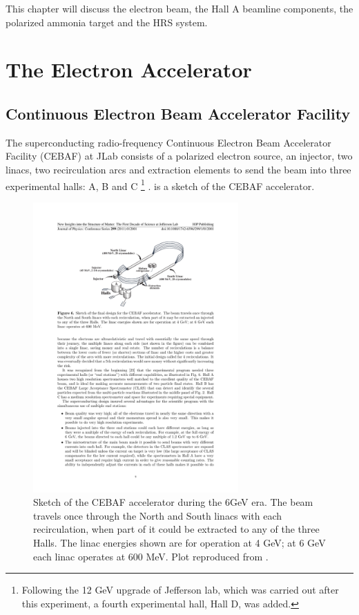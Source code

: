 This chapter will discuss the electron beam, the Hall A beamline components, the polarized ammonia target and the HRS system.

\section{The Electron Accelerator}
\label{C5S1}

\subsection{Continuous Electron Beam Accelerator Facility}
\label{C5S1SS1}

The superconducting radio-frequency Continuous Electron Beam Accelerator Facility (CEBAF) at JLab consists of a polarized electron source, an injector, two linacs, two recirculation arcs and extraction elements to send the beam into three experimental halls: A, B and C \footnote{Following the 12 GeV upgrade of Jefferson lab, which was carried out after this experiment, a fourth experimental hall, Hall D, was added.} \cite{Sulkosky2007}.  is a sketch of the CEBAF accelerator.

\begin{figure}[tb!]
  \centering
  \includegraphics[width=0.7\textwidth]{figs/accelerator.pdf}
  \caption[Sketch of the CEBAF accelerator.]{Sketch of the CEBAF accelerator during the 6GeV era. The beam travels once through the North and South linacs with each recirculation, when part of it could be extracted to any of the three Halls. The linac energies shown are for operation at 4 GeV; at 6 GeV each linac operates at 600 MeV. Plot reproduced from \cite{Gross2011}. \label{C5S1SS1F1}}
\end{figure}

